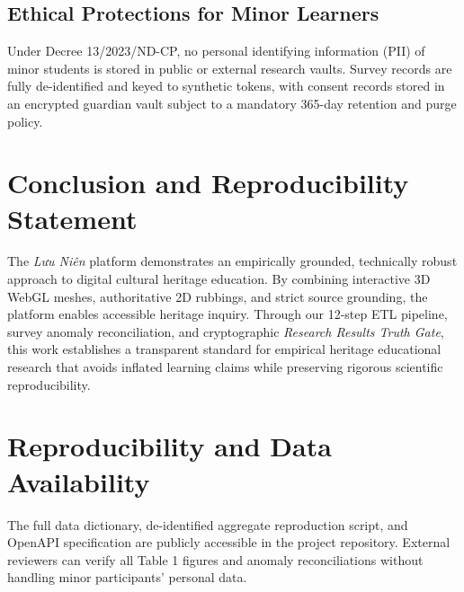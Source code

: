 \documentclass[journal]{IEEEtran}
\begin{document}
\subsection{Ethical Protections for Minor Learners}
Under Decree 13/2023/ND-CP, no personal identifying information (PII) of minor students is stored in public or external research vaults. Survey records are fully de-identified and keyed to synthetic tokens, with consent records stored in an encrypted guardian vault subject to a mandatory 365-day retention and purge policy.

\section{Conclusion and Reproducibility Statement}
The \textit{Lưu Niên} platform demonstrates an empirically grounded, technically robust approach to digital cultural heritage education. By combining interactive 3D WebGL meshes, authoritative 2D rubbings, and strict source grounding, the platform enables accessible heritage inquiry. Through our 12-step ETL pipeline, survey anomaly reconciliation, and cryptographic \textit{Research Results Truth Gate}, this work establishes a transparent standard for empirical heritage educational research that avoids inflated learning claims while preserving rigorous scientific reproducibility.

\section*{Reproducibility and Data Availability}
The full data dictionary, de-identified aggregate reproduction script, and OpenAPI specification are publicly accessible in the project repository. External reviewers can verify all Table 1 figures and anomaly reconciliations without handling minor participants' personal data.
\end{document}
